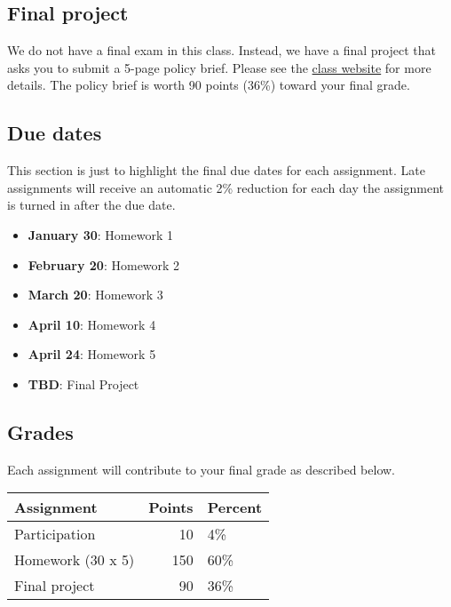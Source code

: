 \documentclass[11pt,]{article}
\providecommand{\tightlist}{%
  \setlength{\itemsep}{0pt}\setlength{\parskip}{0pt}}
\begin{document}
\hypertarget{final-project}{%
\subsection{Final project}\label{final-project}}

We do not have a final exam in this class. Instead, we have a final
project that asks you to submit a 5-page policy brief. Please see the
\href{https://econ470s23.classes.ianmccarthyecon.com/}{class website}
for more details. The policy brief is worth 90 points (36\%) toward your
final grade.

\hypertarget{due-dates}{%
\subsection{Due dates}\label{due-dates}}

This section is just to highlight the final due dates for each
assignment. Late assignments will receive an automatic 2\% reduction for
each day the assignment is turned in after the due date.

\begin{itemize}
\tightlist
\item
  \textbf{January 30}: Homework 1
\item
  \textbf{February 20}: Homework 2
\item
  \textbf{March 20}: Homework 3
\item
  \textbf{April 10}: Homework 4
\item
  \textbf{April 24}: Homework 5
\item
  \textbf{TBD}: Final Project
\end{itemize}

\hypertarget{grades}{%
\subsection{Grades}\label{grades}}

Each assignment will contribute to your final grade as described below.

\begin{longtable}[]{@{}lrl@{}}
\toprule()
Assignment & Points & Percent \\
\midrule()
\endhead
Participation & 10 & 4\% \\
Homework (30 x 5) & 150 & 60\% \\
Final project & 90 & 36\% \\
\bottomrule()
\end{longtable}
\end{document}
